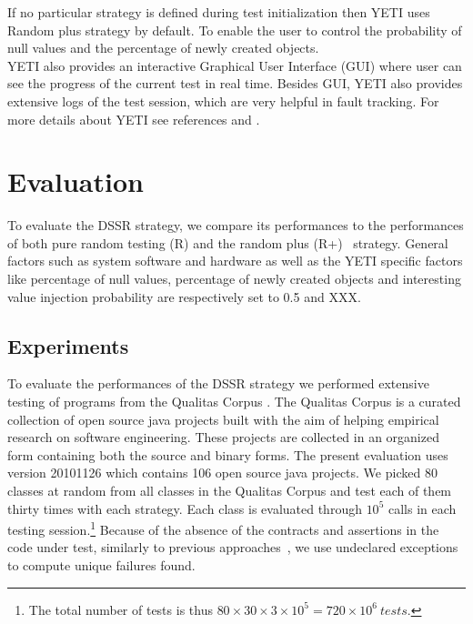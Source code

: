\documentclass[conference]{IEEEtran}
\begin{document}
If no particular strategy is defined during test initialization then YETI uses Random plus strategy by default. To enable the user to control the probability of null values and the percentage of newly created objects.\\
\indent YETI also provides an interactive Graphical User Interface (GUI) where user can see the progress of the current test in real time. Besides GUI, YETI also provides extensive logs of the test session, which are very helpful in fault tracking. For more details about YETI see references \cite{Oriol2010} and \cite{Oriol2010a}.



\section{Evaluation}\label{sec:eval}

To evaluate the DSSR strategy, we compare its performances to the performances of both pure random testing (R) and the random plus (R+)~\cite{Oriol2010} strategy. General factors such as system software and hardware as well as the YETI specific factors like percentage of null values, percentage of newly created objects and interesting value injection probability are respectively set to 0.5 and XXX.\\

\subsection{Experiments}
To evaluate the performances of the DSSR strategy we performed extensive testing of programs from the Qualitas Corpus \cite{Tempero2010a}. The Qualitas Corpus is a curated collection of open source java projects built with the aim of helping empirical research on  software engineering. These projects are collected in an organized form containing both the source and binary forms. The present evaluation uses version 20101126 which contains 106 open source java projects. We picked 80 classes at random from all classes in the Qualitas Corpus and test each of them thirty times with each strategy.
Each class is evaluated through $10^5$ calls in each testing session.\footnote{The total number of tests is thus $80\times 30\times 3 \times 10^5 = 720\times 10^6~tests$.} 
Because of the absence of the contracts and assertions in the code under test, similarly to previous approaches~\cite{Oriol2012}, we use undeclared exceptions to compute unique failures found.
\end{document}
